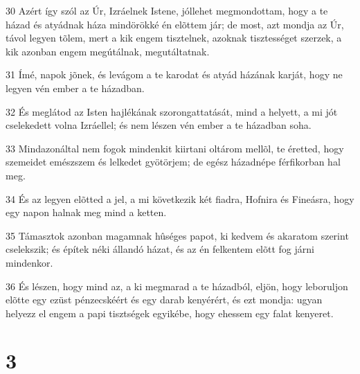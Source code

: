 \par 30 Azért így szól az Úr, Izráelnek Istene, jóllehet megmondottam, hogy a te házad és atyádnak háza mindörökké én elõttem jár; de most, azt mondja az Úr, távol legyen tõlem, mert a kik engem tisztelnek, azoknak tisztességet szerzek, a kik azonban engem megútálnak, megutáltatnak.
\par 31 Ímé, napok jõnek, és levágom a te karodat és atyád házának karját, hogy ne legyen vén ember a te házadban.
\par 32 És meglátod az Isten hajlékának szorongattatását, mind a helyett, a mi jót cselekedett volna Izráellel; és nem lészen vén ember a te házadban soha.
\par 33 Mindazonáltal nem fogok mindenkit kiirtani oltárom mellõl, te éretted, hogy szemeidet emészszem és lelkedet gyötörjem; de egész házadnépe férfikorban hal meg.
\par 34 És az legyen elõtted a jel, a mi következik két fiadra, Hofnira és Fineásra, hogy egy napon halnak meg mind a ketten.
\par 35 Támasztok azonban magamnak hûséges papot, ki kedvem és akaratom szerint cselekszik; és építek néki állandó házat, és az én felkentem elõtt fog járni mindenkor.
\par 36 És lészen, hogy mind az, a ki megmarad a te házadból, eljön, hogy leboruljon elõtte egy ezüst pénzecskéért és egy darab kenyérért, és ezt mondja: ugyan helyezz el engem a papi tisztségek egyikébe, hogy ehessem egy falat kenyeret.

\chapter{3}

